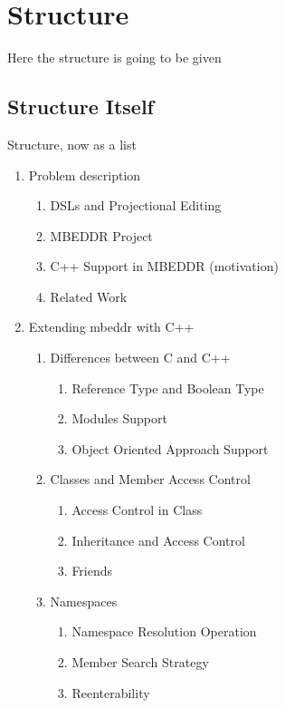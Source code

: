 \chapter{Structure}
\label{chapter:Structure}

Here the structure is going to be given

\section{Structure Itself}

Structure, now as a list

\begin{enumerate}
  
  \item Problem description
  
  \begin{enumerate}
    \item DSLs and Projectional Editing
    \item MBEDDR Project
    \item C++ Support in MBEDDR (motivation)
    \item Related Work
  \end{enumerate}
  
  \item Extending mbeddr with C++
    \begin{enumerate}
      \item Differences between C and C++
	\begin{enumerate}
	 \item Reference Type and Boolean Type
	 \item Modules Support
	 \item Object Oriented Approach Support
	\end{enumerate}
      
      
      



      
      \item Classes and Member Access Control
	\begin{enumerate}
	 \item Access Control in Class
	 \item Inheritance and Access Control
	 \item Friends	 
	\end{enumerate}

      
      \item Namespaces
	\begin{enumerate}
	 \item Namespace Resolution Operation
	 \item Member Search Strategy
	 \item Reenterability
	\end{enumerate}


\end{enumerate}
\end{enumerate}
